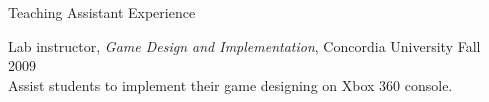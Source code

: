 \documentclass[10pt]{article}
\newenvironment{mydescription}{%
    \begin{description}
        \setlength{\itemsep}{0.25em}%
        \setlength{\parsep}{0em}%
        \setlength{\topsep}{\itemsep}%
        \setlength{\parskip}{0em}%
        \setlength{\labelwidth}{0.1em}
        \setlength{\labelsep}{0em} 
    }%
{\end{description}}
\begin{document}
\begin{cv}
%
%
%
%
%
%
%

\begin{cvlist}{Teaching Assistant Experience}
\item
    \begin{mydescription}
        \item[Lab instructor, \emph{Game Design and Implementation}, Concordia University] \hfill Fall 2009\\
            Assist students to implement their game designing on Xbox 360 console. 


\end{mydescription}
\end{cvlist}
\end{cv}
\end{document}
